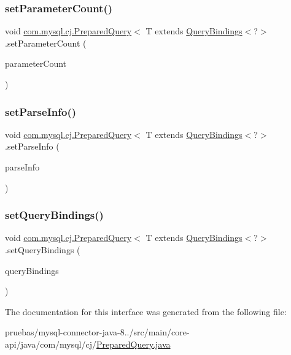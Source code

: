 \subsubsection{\texorpdfstring{set\+Parameter\+Count()}{setParameterCount()}}
{\footnotesize\ttfamily void \mbox{\hyperlink{interfacecom_1_1mysql_1_1cj_1_1_prepared_query}{com.\+mysql.\+cj.\+Prepared\+Query}}$<$ T extends \mbox{\hyperlink{interfacecom_1_1mysql_1_1cj_1_1_query_bindings}{Query\+Bindings}}$<$?$>$.set\+Parameter\+Count (\begin{DoxyParamCaption}\item[{int}]{parameter\+Count }\end{DoxyParamCaption})}

\mbox{\label{interfacecom_1_1mysql_1_1cj_1_1_prepared_query_a616abdbbf0bf436a8324917bbef4078d}} 
\subsubsection{\texorpdfstring{set\+Parse\+Info()}{setParseInfo()}}
{\footnotesize\ttfamily void \mbox{\hyperlink{interfacecom_1_1mysql_1_1cj_1_1_prepared_query}{com.\+mysql.\+cj.\+Prepared\+Query}}$<$ T extends \mbox{\hyperlink{interfacecom_1_1mysql_1_1cj_1_1_query_bindings}{Query\+Bindings}}$<$?$>$.set\+Parse\+Info (\begin{DoxyParamCaption}\item[{\mbox{\hyperlink{classcom_1_1mysql_1_1cj_1_1_parse_info}{Parse\+Info}}}]{parse\+Info }\end{DoxyParamCaption})}

\mbox{\label{interfacecom_1_1mysql_1_1cj_1_1_prepared_query_aefa0302ef70356926e5a31142dc0fd19}} 
\subsubsection{\texorpdfstring{set\+Query\+Bindings()}{setQueryBindings()}}
{\footnotesize\ttfamily void \mbox{\hyperlink{interfacecom_1_1mysql_1_1cj_1_1_prepared_query}{com.\+mysql.\+cj.\+Prepared\+Query}}$<$ T extends \mbox{\hyperlink{interfacecom_1_1mysql_1_1cj_1_1_query_bindings}{Query\+Bindings}}$<$?$>$.set\+Query\+Bindings (\begin{DoxyParamCaption}\item[{T}]{query\+Bindings }\end{DoxyParamCaption})}



The documentation for this interface was generated from the following file\+:\begin{DoxyCompactItemize}
\item 
pruebas/mysql-\/connector-\/java-\/8../src/main/core-\/api/java/com/mysql/cj/\mbox{\hyperlink{_prepared_query_8java}{Prepared\+Query.\+java}}\end{DoxyCompactItemize}

